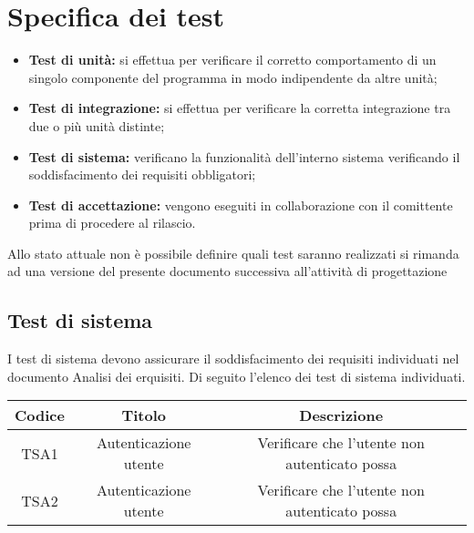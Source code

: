 \section{Specifica dei test}
\begin{itemize}
    \item \textbf{Test di unità:} si effettua per verificare il corretto comportamento di un singolo componente del programma in modo indipendente da altre unità;
    \item \textbf{Test di integrazione:} si effettua per verificare la corretta integrazione tra due o più unità distinte;
    \item \textbf{Test di sistema:} verificano la funzionalità dell'interno sistema verificando il soddisfacimento dei requisiti obbligatori;
    \item \textbf{Test di accettazione:} vengono eseguiti in collaborazione con il comittente prima di procedere al rilascio.
\end{itemize}

Allo stato attuale non è possibile definire quali test saranno realizzati si rimanda ad una versione del presente documento successiva all'attività di progettazione


\subsection{Test di sistema}

I test di sistema devono assicurare il soddisfacimento dei requisiti individuati nel documento Analisi dei erquisiti. 
Di seguito l'elenco dei test di sistema individuati.

\begin{center}
	\begin{longtable}{|c|c|c|}
	\hline
	\rowcolor{lighter-grayer}
	\textbf{Codice} & \textbf{Titolo} & \textbf{Descrizione} \\
	\hline
	\endfirsthead



	\hline
	TSA1 & Autenticazione utente & Verificare che l'utente non autenticato possa  \\
	TSA2 & Autenticazione utente & Verificare che l'utente non autenticato possa  \\

	\hline

	\end{longtable}
\end{center}


